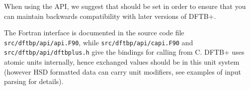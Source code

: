 When using the API, we suggest that  should be set in order to
ensure that you can maintain backwards compatibility with later versions of
DFTB+.

The Fortran interface is documented in the source code file
\verb|src/dftbp/api/api.F90|, while
\verb|src/dftbp/api/capi.F90| and
\verb|src/dftbp/api/dftbplus.h| give the bindings for calling from
C. DFTB+ uses atomic units internally, hence exchanged values should
be in this unit system (however HSD formatted data can carry unit
modifiers, see examples of input parsing for details).
